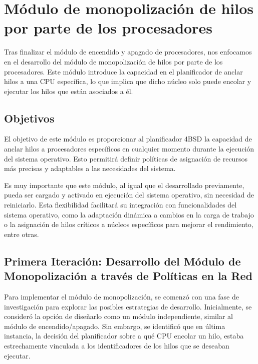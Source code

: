 \section{Módulo de monopolización de hilos por parte de los procesadores}

Tras finalizar el módulo de encendido y apagado de procesadores, nos enfocamos en el desarrollo del módulo de monopolización de hilos por parte de los procesadores. Este módulo introduce la capacidad en el planificador de anclar hilos a una CPU específica, lo que implica que dicho núcleo solo puede encolar y ejecutar los hilos que están asociados a él.\par

\subsection{Objetivos}

El objetivo de este módulo es proporcionar al planificador 4BSD la capacidad de anclar hilos a procesadores específicos en cualquier momento durante la ejecución del sistema operativo. Esto permitirá definir políticas de asignación de recursos más precisas y adaptables a las necesidades del sistema.\par

Es muy importante que este módulo, al igual que el desarrollado previamente, pueda ser cargado y activado en ejecución del sistema operativo, sin necesidad de reiniciarlo. Esta flexibilidad facilitará su integración con funcionalidades del sistema operativo, como la adaptación dinámica a cambios en la carga de trabajo o la asignación de hilos críticos a núcleos específicos para mejorar el rendimiento, entre otras.\par

\subsection{Primera Iteración: Desarrollo del Módulo de Monopolización a través de Políticas en la Red}

Para implementar el módulo de monopolización, se comenzó con una fase de investigación para explorar las posibles estrategias de desarrollo. Inicialmente, se consideró la opción de diseñarlo como un módulo independiente, similar al módulo de encendido/apagado. Sin embargo, se identificó que en última instancia, la decisión del planificador sobre a qué CPU encolar un hilo, estaba estrechamente vinculada a los identificadores de los hilos que se deseaban ejecutar.\par

